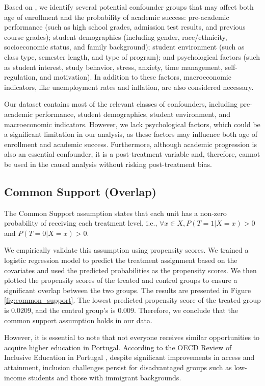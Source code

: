 \documentclass[11pt]{article}
\begin{document}
Based on \citet{alyahyan2020predicting}, we identify several potential confounder groups that may affect both age of enrollment and the probability of academic success: pre-academic performance (such as high school grades, admission test results, and previous course grades); student demographics (including gender, race/ethnicity, socioeconomic status, and family background); student environment (such as class type, semester length, and type of program); and psychological factors (such as student interest, study behavior, stress, anxiety, time management, self-regulation, and motivation). In addition to these factors, macroeconomic indicators, like unemployment rates and inflation, are also considered necessary.

Our dataset contains most of the relevant classes of confounders, including pre-academic performance, student demographics, student environment, and macroeconomic indicators. However, we lack psychological factors, which could be a significant limitation in our analysis, as these factors may influence both age of enrollment and academic success. Furthermore, although academic progression is also an essential confounder, it is a post-treatment variable and, therefore, cannot be used in the causal analysis without risking post-treatment bias.

\subsection{Common Support (Overlap)}

The Common Support assumption states that each unit has a non-zero probability of receiving each treatment level, i.e., $\forall x \in X, P(T=1|X=x) > 0$ and $P(T=0|X=x) > 0$.

We empirically validate this assumption using propensity scores. We trained a logistic regression model to predict the treatment assignment based on the covariates and used the predicted probabilities as the propensity scores. We then plotted the propensity scores of the treated and control groups to ensure a significant overlap between the two groups. The results are presented in Figure \ref{fig:common_support}. The lowest predicted propensity score of the treated group is $0.0209$, and the control group's is $0.009$. Therefore, we conclude that the common support assumption holds in our data.

However, it is essential to note that not everyone receives similar opportunities to acquire higher education in Portugal. According to the OECD Review of Inclusive Education in Portugal \citep{/content/publication/a9c95902-en}, despite significant improvements in access and attainment, inclusion challenges persist for disadvantaged groups such as low-income students and those with immigrant backgrounds. 
\end{document}
